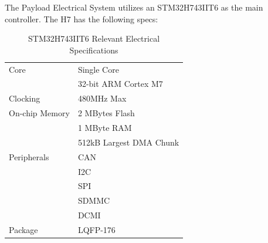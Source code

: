 \documentclass[12pt,a4paper]{article}
\begin{document}
    The Payload Electrical System utilizes an STM32H743IIT6 as the main 
    controller. The H7 has the following specs:

    \begin{table}[H]\centering
        \begin{tabular}{l | l}
            Core & Single Core \\
            & 32-bit ARM Cortex M7 \\ \hline
            Clocking & 480MHz Max \\ \hline
            On-chip Memory & 2 MBytes Flash \\
            & 1 MByte RAM \\ 
            & 512kB Largest DMA Chunk \\ \hline
            Peripherals & CAN \\
            & I2C \\
            & SPI \\
            & SDMMC \\
            & DCMI \\ \hline
            Package & LQFP-176\\ 
        \end{tabular}
        \caption{STM32H743IIT6 Relevant Electrical Specifications}
    \end{table}
\end{document}
